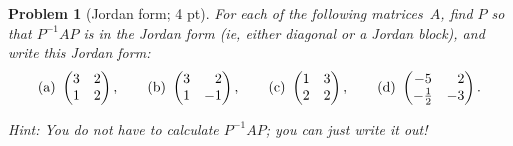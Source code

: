 \documentclass[12pt,a4]{article}
\newtheorem{problem}{Problem}
\begin{document}
\begin{problem}[Jordan form; 4 pt]\rm
	For each of the following matrices~$A$, find $P$ so that $P^{-1}AP$ is in the Jordan form (ie, either diagonal or a Jordan block), and write this Jordan form:
	\[
	\mathrm{(a)} \ \begin{pmatrix}
	3 & 2 \\ 1 & 2
	\end{pmatrix}, \qquad
	\mathrm{(b)} \ \begin{pmatrix}
	3 & \hphantom{-}2 \\ 1 & -1
	\end{pmatrix}, \qquad
	\mathrm{(c)} \ \begin{pmatrix}
	1 & 3 \\ 2 & 2
	\end{pmatrix}, \qquad
	\mathrm{(d)} \ \begin{pmatrix}
	-5 & \hphantom{-}2 \\ -\tfrac12 & -3
	\end{pmatrix}.
	\]
	
	{\small \textsf{Hint:
			You do not have to calculate $P^{-1}AP$; you can just write it out!}}
\end{problem}
\end{document}
